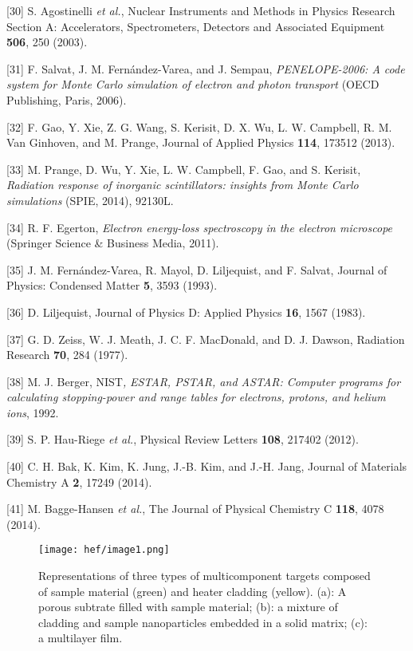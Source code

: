 {[}30{]} S. Agostinelli \emph{et al.}, Nuclear Instruments and Methods
in Physics Research Section A: Accelerators, Spectrometers, Detectors
and Associated Equipment \textbf{506}, 250 (2003).

{[}31{]} F. Salvat, J. M. Fernández-Varea, and J. Sempau,
\emph{PENELOPE-2006: A code system for Monte Carlo simulation of
electron and photon transport} (OECD Publishing, Paris, 2006).

{[}32{]} F. Gao, Y. Xie, Z. G. Wang, S. Kerisit, D. X. Wu, L. W.
Campbell, R. M. Van Ginhoven, and M. Prange, Journal of Applied Physics
\textbf{114}, 173512 (2013).

{[}33{]} M. Prange, D. Wu, Y. Xie, L. W. Campbell, F. Gao, and S.
Kerisit, \emph{Radiation response of inorganic scintillators: insights
from Monte Carlo simulations} (SPIE, 2014), 92130L.

{[}34{]} R. F. Egerton, \emph{Electron energy-loss spectroscopy in the
electron microscope} (Springer Science \& Business Media, 2011).

{[}35{]} J. M. Fernández-Varea, R. Mayol, D. Liljequist, and F. Salvat,
Journal of Physics: Condensed Matter \textbf{5}, 3593 (1993).

{[}36{]} D. Liljequist, Journal of Physics D: Applied Physics
\textbf{16}, 1567 (1983).

{[}37{]} G. D. Zeiss, W. J. Meath, J. C. F. MacDonald, and D. J. Dawson,
Radiation Research \textbf{70}, 284 (1977).

{[}38{]} M. J. Berger, NIST\emph{,} \emph{ESTAR, PSTAR, and ASTAR:
Computer programs for calculating stopping-power and range tables for
electrons, protons, and helium ions}, 1992.

{[}39{]} S. P. Hau-Riege \emph{et al.}, Physical Review Letters
\textbf{108}, 217402 (2012).

{[}40{]} C. H. Bak, K. Kim, K. Jung, J.-B. Kim, and J.-H. Jang, Journal
of Materials Chemistry A \textbf{2}, 17249 (2014).

{[}41{]} M. Bagge-Hansen \emph{et al.}, The Journal of Physical
Chemistry C \textbf{118}, 4078 (2014).

\begin{figure}[h]
\caption{
Representations of three types of multicomponent
targets composed of sample material (green) and heater cladding
(yellow). (a): A porous subtrate filled with sample material; (b): a
mixture of cladding and sample nanoparticles embedded in a solid matrix;
(c): a multilayer film.
}
\label{fig:hef_image1}
\centering
\texttt{[image: hef/image1.png]}
\end{figure}

